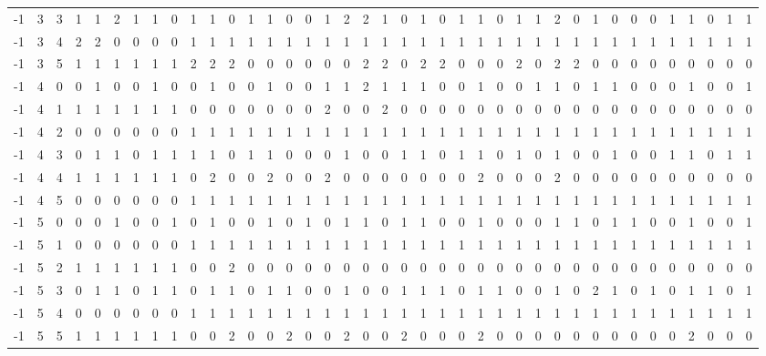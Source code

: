 {\begin{longtable}{rrr|rrrrrr|rrrrrr|rrrrrr|rrrrrr|rrrrrr|rrrrrr}
-1&3&3&1&1&2&1&1&0&1&1&0&1&1&0&0&1&2&2&1&0&1&0&1&1&0&1&1&2&0&1&0&0&0&1&1&0&1&1\\
-1&3&4&2&2&0&0&0&0&1&1&1&1&1&1&1&1&1&1&1&1&1&1&1&1&1&1&1&1&1&1&1&1&1&1&1&1&1&1\\
-1&3&5&1&1&1&1&1&1&2&2&2&0&0&0&0&0&0&2&2&0&2&2&0&0&0&2&0&2&2&0&0&0&0&0&0&0&0&0\\
-1&4&0&0&1&0&0&1&0&0&1&0&0&1&0&0&1&1&2&1&1&1&0&0&1&0&0&1&1&0&1&1&0&0&0&1&0&0&1\\
-1&4&1&1&1&1&1&1&1&0&0&0&0&0&0&0&2&0&0&2&0&0&0&0&0&0&0&0&0&0&0&0&0&0&0&0&0&0&0\\
-1&4&2&0&0&0&0&0&0&1&1&1&1&1&1&1&1&1&1&1&1&1&1&1&1&1&1&1&1&1&1&1&1&1&1&1&1&1&1\\
-1&4&3&0&1&1&0&1&1&1&1&0&1&1&0&0&0&1&0&0&1&1&0&1&1&0&1&0&1&0&0&1&0&0&1&1&0&1&1\\
-1&4&4&1&1&1&1&1&1&0&2&0&0&2&0&0&2&0&0&0&0&0&0&0&2&0&0&0&2&0&0&0&0&0&0&0&0&0&0\\
-1&4&5&0&0&0&0&0&0&1&1&1&1&1&1&1&1&1&1&1&1&1&1&1&1&1&1&1&1&1&1&1&1&1&1&1&1&1&1\\
-1&5&0&0&0&1&0&0&1&0&1&0&0&1&0&1&0&1&1&0&1&1&0&0&1&0&0&0&1&1&0&1&1&0&0&1&0&0&1\\
-1&5&1&0&0&0&0&0&0&1&1&1&1&1&1&1&1&1&1&1&1&1&1&1&1&1&1&1&1&1&1&1&1&1&1&1&1&1&1\\
-1&5&2&1&1&1&1&1&1&0&0&2&0&0&0&0&0&0&0&0&0&0&0&0&0&0&0&0&0&0&0&0&0&0&0&0&0&0&0\\
-1&5&3&0&1&1&0&1&1&0&1&1&0&1&1&0&0&1&0&0&1&1&1&0&1&1&0&0&1&0&2&1&0&1&0&1&1&0&1\\
-1&5&4&0&0&0&0&0&0&1&1&1&1&1&1&1&1&1&1&1&1&1&1&1&1&1&1&1&1&1&1&1&1&1&1&1&1&1&1\\
-1&5&5&1&1&1&1&1&1&0&0&2&0&0&2&0&0&2&0&0&2&0&0&0&2&0&0&0&0&0&0&0&0&0&0&2&0&0&0\\
\end{longtable}
}
